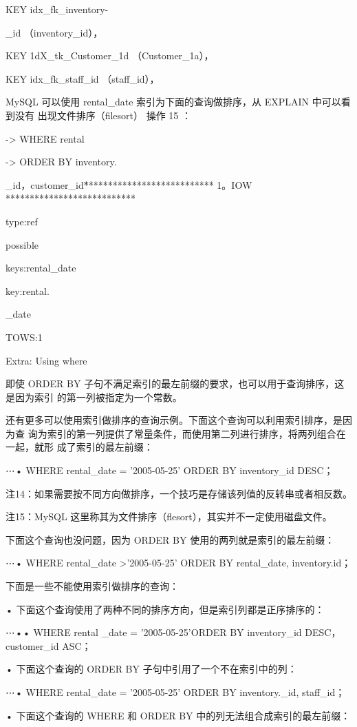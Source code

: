 KEY idx\_fk\_inventory-

\_id （inventory\_id），

KEY 1dX\_tk\_Customer\_1d （Customer\_1a），

KEY idx\_fk\_staff\_id （staff\_id），

MySQL 可以使用 rental\_date 索引为下面的查询做排序，从 EXPLAIN 中可以看到没有
出现文件排序（filesort） 操作 15 ：

-> WHERE rental

-> ORDER BY inventory.

\_id，customer\_id\G

*************************** 1。IOW ***************************

type:ref

possible

keys:rental\_date

key:rental.

\_date

TOWS:1

Extra: Using where

即使 ORDER BY 子句不满足索引的最左前缀的要求，也可以用于查询排序，这是因为索引
的第一列被指定为一个常数。

还有更多可以使用索引做排序的查询示例。下面这个查询可以利用索引排序，是因为查
询为索引的第一列提供了常量条件，而使用第二列进行排序，将两列组合在一起，就形
成了索引的最左前缀：

⋯• WHERE rental\_date = '2005-05-25' ORDER BY inventory\_id DESC；

注14：如果需要按不同方向做排序，一个技巧是存储该列值的反转串或者相反数。

注15：MySQL 这里称其为文件排序（flesort），其实并不一定使用磁盘文件。

下面这个查询也没问题，因为 ORDER BY 使用的两列就是索引的最左前缀：

⋯• WHERE rental\_date >'2005-05-25' ORDER BY rental\_date, inventory.id；

下面是一些不能使用索引做排序的查询：

• 下面这个查询使用了两种不同的排序方向，但是索引列都是正序排序的：

⋯•• WHERE rental \_date = '2005-05-25'ORDER BY inventory\_id DESC， customer\_id ASC；

• 下面这个查询的 ORDER BY 子句中引用了一个不在索引中的列：

⋯• WHERE rental\_date = '2005-05-25' ORDER BY inventory.\_id, staff\_id；

• 下面这个查询的 WHERE 和 ORDER BY 中的列无法组合成索引的最左前缀：

